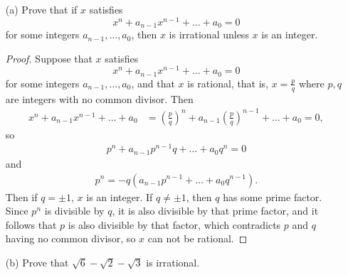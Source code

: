 \documentclass{article}
\begin{document}
\begin{enumerate}
	\item[(a)] Prove that if $x$ satisfies \[x^n + a_{n-1}x^{n-1} + \dots + a_0 = 0\] for some integers $a_{n-1}, \dots, a_0$, then $x$ is irrational unless $x$ is an integer.
	
	\begin{proof}
		Suppose that $x$ satisfies \[x^n + a_{n-1}x^{n-1} + \dots + a_0 = 0\] for some integers $a_{n-1}, \dots, a_0$, and that $x$ is rational, that is, $x = \frac{p}{q}$ where $p, q$ are integers with no common divisor. Then
		\begin{align*}
			x^n + a_{n-1}x^{n-1} + \dots + a_0 &= \left(\frac{p}{q}\right)^n + a_{n-1}\left(\frac{p}{q}\right)^{n-1} + \dots + a_0 = 0,
		\end{align*}so
		\begin{align*}
			p^n + a_{n-1}p^{n-1}q + \dots + a_0q^n = 0 
		\end{align*} and
		\begin{align*}
			p^n = -q\left(a_{n-1}p^{n-1} + \dots + a_0q^{n-1}\right).
		\end{align*}
		Then if $q = \pm1$, $x$ is an integer. If $q \ne \pm1$, then $q$ has some prime factor. Since $p^n$ is divisible by $q$, it is also divisible by that prime factor, and it follows that $p$ is also divisible by that factor, which contradicts $p$ and $q$ having no common divisor, so $x$ can not be rational.
	\end{proof}

	\item[(b)] Prove that $\sqrt{6} - \sqrt{2} - \sqrt{3}$ is irrational.
	

\end{enumerate}
\end{document}
